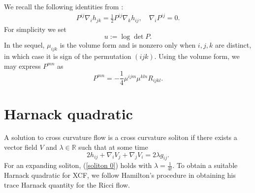 \documentclass{amsart}
\theoremstyle{definition}
\theoremstyle{remark}
\numberwithin{equation}{section}
\begin{document}
We recall the following identities from \cite[Lemma 1]{Chowcross2002}:
\begin{align}\label{equ: important}
P^{ij}\nabla_ih_{jk}=\frac{1}{2}P^{ij}\nabla_kh_{ij},\quad\nabla_iP^{ij}=0.
\end{align}
For simplicity we set
\[u:=\log\det P.\]
In the sequel, $\mu_{ijk}$ is the volume form and is nonzero only when $i,j,k$ are distinct, in which case it is sign of the permutation $(ijk)$. Using the volume form, we may express $P^{mn}$ as
\begin{equation}
P^{mn}=-\frac{1}{4}\mu^{ijm}\mu^{kln}R_{ijkl}.
\end{equation}
\section{Harnack quadratic}
A solution to cross curvature flow is a cross curvature soliton if there exists a vector field $V$ and $\lambda\in \mathbb{R}$ such that at some time
\begin{equation}\label{soliton 0}
2h_{ij}+\nabla_iV_j+\nabla_jV_i=2\lambda g_{ij}.
\end{equation}
For an expanding soliton, (\ref{soliton 0}) holds with $\lambda=\frac{1}{4t}.$
To obtain a suitable Harnack quadratic for XCF, we follow Hamilton's procedure in obtaining his trace Harnack quantity for the Ricci flow.
\end{document}
